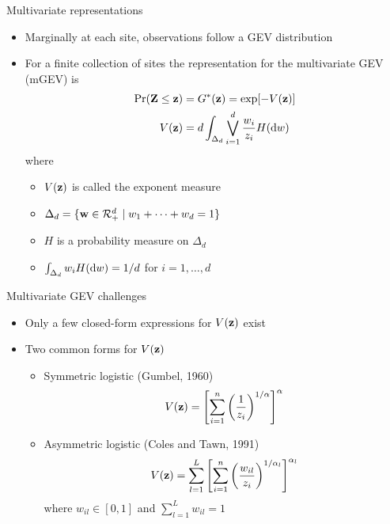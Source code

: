 \documentclass{beamer}
\begin{document}
 \begin{frame}{Multivariate representations}
   \begin{itemize} \setlength{\itemsep}{1em}
     \item Marginally at each site, observations follow a GEV distribution
     \item For a finite collection of sites the representation for the multivariate GEV (mGEV) is
     \begin{align*}
       \Pr(\mathbf{Z} \le \mathbf{z})  &= G^*(\mathbf{z}) = \exp[-V(\mathbf{z})]\\
             V(\mathbf{z})    &= d \int_{\Delta_d} \bigvee_{i = 1}^d \frac{w_i}{z_i} H(\text{d} w)
     \end{align*}
     where
     \begin{itemize} \setlength{\itemsep}{0.25em}
       \item $V(\mathbf{z})$ is called the exponent measure
       \item $\Delta_d = \{ \mathbf{w} \in {\cal R}^d_+ \mid w_1 + \cdots + w_d = 1\}$
       \item $H$ is a probability measure on $\Delta_d$
       \item $\int_{\Delta_d}w_i H(\text{d} w) = 1 / d$ for $i = 1, \ldots, d$
     \end{itemize}
   \end{itemize}
 \end{frame}

 \begin{frame}{Multivariate GEV challenges}
   \begin{itemize} \setlength{\itemsep}{1em}
     \item Only a few closed-form expressions for $V(\mathbf{z})$ exist
     \item Two common forms for $V(\mathbf{z})$
     \begin{itemize}
       \item Symmetric logistic (Gumbel, 1960)
       \begin{align*}
         V(\mathbf{z}) = \left[\sum_{i = 1}^n \left( \frac{ 1 }{ z_i } \right)^{1/\alpha}\right]^\alpha
       \end{align*}
       \item Asymmetric logistic (Coles and Tawn, 1991)
       \begin{align*}
         V(\mathbf{z}) = \sum_{l = 1}^L \left[\sum_{i = 1}^n \left(\frac{w_{il}}{z_i} \right)^{1 / \alpha_l} \right]^{\alpha_l}
       \end{align*}
       where $w_{il} \in [0, 1]$ and $\sum_{l = 1}^L w_{il} = 1$
     \end{itemize}
   \end{itemize}
 \end{frame}
\end{document}
